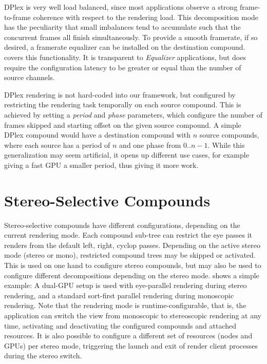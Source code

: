 DPlex is very well load balanced, since most applications observe a strong
frame-to-frame coherence with respect to the rendering load. This decomposition
mode has the peculiarity that small imbalances tend to accumulate such that the
concurrent frames all finish simultaneously. To provide a smooth framerate, if
so desired, a framerate equalizer can be installed on the destination compound.
 covers this functionality. It is transparent to
{\em Equalizer} applications, but does require the configuration latency to
be greater or equal than the number of source channels.

DPlex rendering is not hard-coded into our framework, but configured by
restricting the rendering task temporally on each source compound. This is
achieved by setting a {\em period} and {\em phase} parameters, which
configure the number of frames skipped and starting offset on the given source
compound. A simple DPlex compound would have a destination compound with $n$
source compounds, where each source has a period of $n$ and one phase from
$0..n-1$. While this generalization may seem artificial, it opens up different
use cases, for example giving a fast GPU a smaller period, thus giving it more
work.

\section{Stereo-Selective Compounds}

Stereo-selective compounds have different configurations, depending on the
current rendering mode. Each compound sub-tree can restrict the eye passes it
renders from the default left, right, cyclop passes. Depending on the active
stereo mode (stereo or mono), restricted compound trees may be skipped or
activated. This is used on one hand to configure stereo compounds, but may also
be used to configure different decompositions depending on the stereo mode.
 shows a simple example: A dual-GPU setup is used with
eye-parallel rendering during stereo rendering, and a standard sort-first
parallel rendering during monoscopic rendering. Note that the rendering mode is
runtime-configurable, that is, the application can switch the view from
monoscopic to stereoscopic rendering at any time, activating and deactivating
the configured compounds and attached resources. It is also possible to
configure a different set of resources (nodes and GPUs) per stereo mode,
triggering the launch and exit of render client processes during the stereo
switch.

